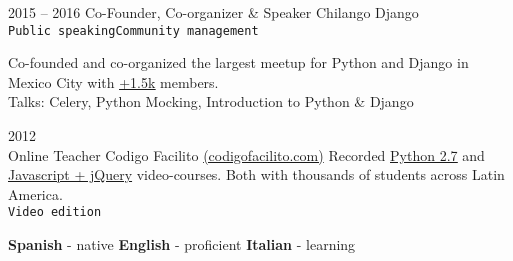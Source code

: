 \documentclass[9pt]{developercv} %
\begin{document}

\begin{entrylist}
    \entry
        {2015 -- 2016}
        {Co-Founder, Co-organizer \& Speaker}
        {
            Chilango Django \\
            \texttt{Public speaking}\slashsep\texttt{Community management}
        }
        {
            
            Co-founded and co-organized the largest meetup for Python and Django in 
            Mexico City with {\href{https://meetup.com/Chilango-Django/}{\underline{+1.5k}}} members. \\

            \small{Talks: Celery, Python Mocking, Introduction to Python \& Django}
            
        }
    \entry
        {2012\\\footnotesize{Online}}
        {Teacher}
        {Codigo Facilito {\href{(https://codigofacilito.com/}{(codigofacilito.com)}}}
        {
            Recorded 
            {\href{https://www.youtube.com/watch?v=CjmzDHMHxwU&list=PLE549A038CF82905F}{\underline{Python 2.7}}} 
            and {\href{https://www.youtube.com/watch?v=jKbjblt4NXA&list=PLpOqH6AE0tNi47LF-_6gddgq10lp_TLDB}{\underline{Javascript + jQuery}}} 
            video-courses. Both with thousands of students across Latin America.\\
            \texttt{Video edition}
        }
\end{entrylist}


\begin{minipage}[t]{1\textwidth}
    \vspace{-\baselineskip} %
    \textbf{Spanish} - native
    \slashsep\textbf{English} - proficient
    \slashsep\textbf{Italian} - learning
\end{minipage}
\end{document}
